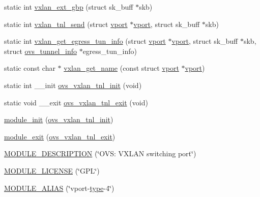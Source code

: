 \begin{DoxyCompactItemize}
\item 
static int \hyperlink{linux_2vport-vxlan_8c_a20eca97b66cc1631237638ba80d3f6f4}{vxlan\+\_\+ext\+\_\+gbp} (struct sk\+\_\+buff $\ast$skb)
\item 
static int \hyperlink{linux_2vport-vxlan_8c_a3f79b05ea9b700c041b3aff7361e707f}{vxlan\+\_\+tnl\+\_\+send} (struct \hyperlink{structvport}{vport} $\ast$\hyperlink{structvport}{vport}, struct sk\+\_\+buff $\ast$skb)
\item 
static int \hyperlink{linux_2vport-vxlan_8c_a24930f1f6ecb4c221d189f13253a5feb}{vxlan\+\_\+get\+\_\+egress\+\_\+tun\+\_\+info} (struct \hyperlink{structvport}{vport} $\ast$\hyperlink{structvport}{vport}, struct sk\+\_\+buff $\ast$skb, struct \hyperlink{structovs__tunnel__info}{ovs\+\_\+tunnel\+\_\+info} $\ast$egress\+\_\+tun\+\_\+info)
\item 
static const char $\ast$ \hyperlink{linux_2vport-vxlan_8c_a8c4bc3ac94b12c027f1c2148fae55d61}{vxlan\+\_\+get\+\_\+name} (const struct \hyperlink{structvport}{vport} $\ast$\hyperlink{structvport}{vport})
\item 
static int \+\_\+\+\_\+init \hyperlink{linux_2vport-vxlan_8c_a1c1c84a2865e1fdf35836751a795916c}{ovs\+\_\+vxlan\+\_\+tnl\+\_\+init} (void)
\item 
static void \+\_\+\+\_\+exit \hyperlink{linux_2vport-vxlan_8c_a93fd41de4d7cb36dccd5e2c57310ef71}{ovs\+\_\+vxlan\+\_\+tnl\+\_\+exit} (void)
\item 
\hyperlink{linux_2vport-vxlan_8c_a32ade2284afa4864170856c68e08907e}{module\+\_\+init} (\hyperlink{vport-vxlan_8c_a1c1c84a2865e1fdf35836751a795916c}{ovs\+\_\+vxlan\+\_\+tnl\+\_\+init})
\item 
\hyperlink{linux_2vport-vxlan_8c_acfe49db4b9b9e976d671d08c1bbf052f}{module\+\_\+exit} (\hyperlink{vport-vxlan_8c_a93fd41de4d7cb36dccd5e2c57310ef71}{ovs\+\_\+vxlan\+\_\+tnl\+\_\+exit})
\item 
\hyperlink{linux_2vport-vxlan_8c_a8c4652622a726ee59702be21c375bcd1}{M\+O\+D\+U\+L\+E\+\_\+\+D\+E\+S\+C\+R\+I\+P\+T\+I\+O\+N} (\char`\"{}O\+V\+S\+: V\+X\+L\+A\+N switching port\char`\"{})
\item 
\hyperlink{linux_2vport-vxlan_8c_ad94b36675e7eb067ea3ce6ff9e244a44}{M\+O\+D\+U\+L\+E\+\_\+\+L\+I\+C\+E\+N\+S\+E} (\char`\"{}G\+P\+L\char`\"{})
\item 
\hyperlink{linux_2vport-vxlan_8c_ad0e081f4770ba9f49ea55358f08183b1}{M\+O\+D\+U\+L\+E\+\_\+\+A\+L\+I\+A\+S} (\char`\"{}vport-\/\hyperlink{flow_8h_ab22aaab04f806700def00f32823fcb9e}{type}-\/4\char`\"{})
\end{DoxyCompactItemize}


